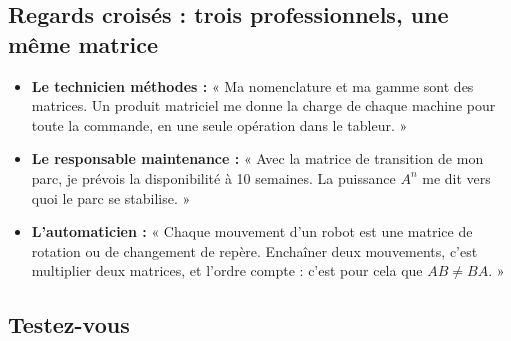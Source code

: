 \documentclass[a4paper,11pt]{article}
\begin{document}
\subsection{Regards croisés : trois professionnels, une même matrice}\label{subsec:regards}

\begin{remarque}
\begin{itemize}
  \item \textbf{Le technicien méthodes :} « Ma nomenclature et ma gamme sont des matrices. Un produit matriciel me donne la charge de chaque machine pour toute la commande, en une seule opération dans le tableur. »
  \item \textbf{Le responsable maintenance :} « Avec la matrice de transition de mon parc, je prévois la disponibilité à 10 semaines. La puissance $A^n$ me dit vers quoi le parc se stabilise. »
  \item \textbf{L'automaticien :} « Chaque mouvement d'un robot est une matrice de rotation ou de changement de repère. Enchaîner deux mouvements, c'est multiplier deux matrices, et l'ordre compte : c'est pour cela que $AB\neq BA$. »
\end{itemize}
\end{remarque}

\needspace{12cm}\subsection{Testez-vous}\label{subsec:quiz}
\end{document}
